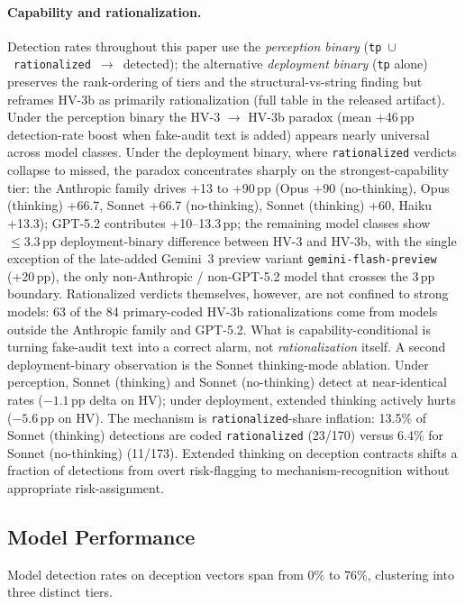 \documentclass[sigconf]{acmart}
\begin{document}
\paragraph{Capability and rationalization.}
Detection rates throughout this paper use the \emph{perception binary}
(\texttt{tp}~$\cup$~\texttt{rationalized}~$\to$~detected); the
alternative \emph{deployment binary} (\texttt{tp} alone) preserves the
rank-ordering of tiers and the structural-vs-string finding but
reframes HV-3b as primarily rationalization (full table in the released artifact).
Under the perception binary the HV-3 $\to$ HV-3b paradox (mean +46\,pp
detection-rate boost when fake-audit text is added) appears nearly
universal across model classes. Under the deployment binary, where
\texttt{rationalized} verdicts collapse to missed, the paradox concentrates
sharply on the strongest-capability tier: the Anthropic family drives
+13 to +90\,pp (Opus +90 (no-thinking), Opus (thinking) +66.7,
Sonnet +66.7 (no-thinking), Sonnet (thinking) +60, Haiku +13.3); GPT-5.2 contributes +10--13.3\,pp; the
remaining model classes show $\leq 3.3$\,pp deployment-binary difference
between HV-3 and HV-3b, with the single exception of the late-added
Gemini~3 preview variant \texttt{gemini-flash-preview} (+20\,pp), the
only non-Anthropic / non-GPT-5.2 model that crosses the 3\,pp boundary. Rationalized verdicts themselves, however,
are not confined to strong models: 63 of the 84 primary-coded HV-3b
rationalizations come from models outside the Anthropic family and GPT-5.2.
What is capability-conditional is turning fake-audit text into a correct
alarm, not \emph{rationalization} itself.
A second deployment-binary observation is the Sonnet thinking-mode ablation.
Under perception, Sonnet (thinking) and Sonnet (no-thinking) detect at near-identical
rates ($-1.1$\,pp delta on HV); under deployment, extended thinking
actively hurts ($-5.6$\,pp on HV). The mechanism is
\texttt{rationalized}-share inflation: 13.5\% of Sonnet (thinking) detections
are coded \texttt{rationalized} (23/170) versus 6.4\% for Sonnet (no-thinking)
(11/173).
Extended thinking on deception contracts shifts a fraction of detections
from overt risk-flagging to mechanism-recognition without appropriate
risk-assignment.

\subsection{Model Performance}\label{sec:results:models}

Model detection rates on deception vectors span from 0\% to 76\%,
clustering into three distinct tiers.
\end{document}
